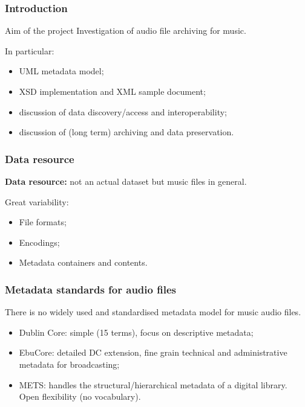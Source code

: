 \documentclass{beamer}
\newcommand\rb[1]{\textcolor{ThemeRed}{\textbf{#1}}}
\begin{document}
  \begin{frame}
    \frametitle{Introduction}

    \begin{block}{Aim of the project}
      Investigation of audio file archiving for music.
    \end{block}

    \vspace{1em}

    In particular:

    \vspace{0.5em}

    \begin{itemize}
      \itemsep0.5em
      \item UML metadata model;
      \item XSD implementation and XML sample document;
      \item discussion of data discovery/access and interoperability;
      \item discussion of (long term) archiving and data preservation.
    \end{itemize}
  \end{frame}
  
  
  
  \begin{frame}
    \frametitle{Data resource}
    
    \rb{Data resource:} not an actual dataset but music files in general.
        
    \vspace{1em}
    
    Great variability:

    \vspace{0.5em}
        
    \begin{itemize}
      \itemsep0.5em
      \item File formats;
      \item Encodings;
      \item Metadata containers and contents.
    \end{itemize}
  \end{frame}



  \begin{frame}
    \frametitle{Metadata standards for audio files}

    There is no widely used and standardised metadata model for music audio files.

    \vspace{1em}

    \begin{itemize}
      \itemsep1em
      \item Dublin Core: simple (15 terms), focus on descriptive metadata;
      \item EbuCore: detailed DC extension, fine grain technical and administrative metadata for broadcasting;
      \item METS: handles the structural/hierarchical metadata of a digital library. Open flexibility (no vocabulary).
    \end{itemize}
  \end{frame}
\end{document}
